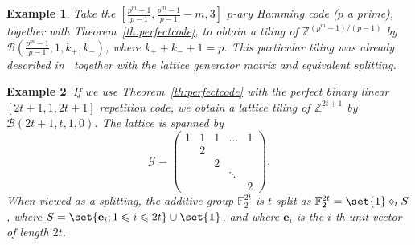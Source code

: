 \documentclass[sort&compress]{elsarticle}
\newcommand{\cB}{\mathcal{B}}
\newcommand{\cG}{\mathcal{G}}
\renewcommand{\leq}{\leqslant}
\newtheorem{example}{Example}
\newcommand{\F}{\mathbb{F}}
\newcommand{\Z}{\mathbb{Z}}
\newcommand{\ve}{\mathbf{e}}
\newcommand{\One}{{\mathbf{1}}}
\newcommand{\kp}{k_+}
\newcommand{\km}{k_-}
\newcommand{\splt}{\diamond}
\begin{document}
\begin{example}
  Take the $[\frac{p^m-1}{p-1},\frac{p^m-1}{p-1}-m,3]$ $p$-ary Hamming
  code ($p$ a prime), together with Theorem~\ref{th:perfectcode}, to
  obtain a tiling of $\Z^{(p^m-1)/(p-1)}$ by
  $\cB(\frac{p^m-1}{p-1},1,\kp,\km)$, where $\kp+\km+1=p$. This
  particular tiling was already described in~\cite{Sch12} together
  with the lattice generator matrix and equivalent splitting.
\end{example}

\begin{example}
  \label{ex:ex2}
  If we use Theorem~\ref{th:perfectcode} with the perfect binary
  linear $[2t+1,1,2t+1]$ repetition code, we obtain a lattice tiling
  of $\Z^{2t+1}$ by $\cB(2t+1,t,1,0)$. The lattice is spanned by
  \[ \cG=\begin{pmatrix}
    1 & 1 & 1 & \dots  & 1 \\
      & 2 &   &        &   \\
      &   & 2 &        &   \\
      &   &   & \ddots &   \\
      &   &   &        & 2
  \end{pmatrix}.\]
  When viewed as a splitting, the additive group $\F_2^{2t}$ is
  $t$-split as $\F_2^{2t}=\set{1}\splt_t S$, where $S=\set{\ve_i ;
    1\leq i\leq 2t}\cup\set{\One}$, and where $\ve_i$ is the $i$-th
  unit vector of length $2t$.
\end{example}
\end{document}
